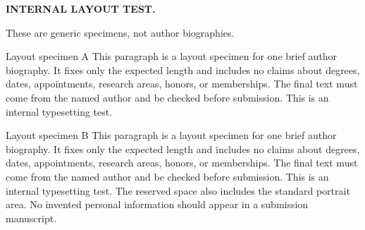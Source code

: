 \documentclass[journal]{IEEEtran}
\begin{document}
{\raggedright\noindent\textbf{INTERNAL LAYOUT TEST.}\par
These are generic specimens, not author biographies.\par}
\noindent\begin{minipage}{\columnwidth}
\begin{IEEEbiography}{Layout specimen A}
This paragraph is a layout specimen for one brief author biography. It fixes only the expected length and includes no claims about degrees, dates, appointments, research areas, honors, or memberships. The final text must come from the named author and be checked before submission. This is an internal typesetting test.
\end{IEEEbiography}
\begin{IEEEbiography}{Layout specimen B}
This paragraph is a layout specimen for one brief author biography. It fixes only the expected length and includes no claims about degrees, dates, appointments, research areas, honors, or memberships. The final text must come from the named author and be checked before submission. This is an internal typesetting test. The reserved space also includes the standard portrait area. No invented personal information should appear in a submission manuscript.
\end{IEEEbiography}
\end{minipage}
\end{document}
